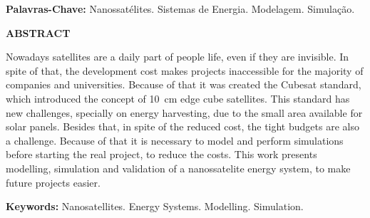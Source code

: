 \documentclass[a5paper, oldfontcommands, hidelinks]{ufsc-thesis}  %
\begin{document}
\noindent\textbf{Palavras-Chave:} Nanossatélites. Sistemas de Energia. Modelagem. Simulação.

\clearpage
\begin{center}
\large\textbf{ABSTRACT}
\end{center}
Nowadays satellites are a daily part of people life, even if they are invisible. In spite of that, the development cost makes projects inaccessible for the majority of companies and universities. Because of that it was created the Cubesat standard, which introduced the concept of \SI{10}{\centi\metre} edge cube satellites. This standard has new challenges, specially on energy harvesting, due to the small area available for solar panels. Besides that, in spite of the reduced cost, the tight budgets are also a challenge.  Because of that it is necessary to model and perform simulations before starting the real project, to reduce the costs. This work  presents modelling, simulation and validation of a nanossatelite energy system, to make future projects easier.

\noindent\textbf{Keywords:} Nanosatellites. Energy Systems. Modelling. Simulation.

\clearpage
\listoffigures
\clearpage
\listoftables
\glsaddall 
\printglossary[type=\acronymtype, title = Lista de Abreviaturas e Siglas]
\clearpage
\setcounter{tocdepth}{3} %
\tableofcontents















\printbibliography
\end{document}
